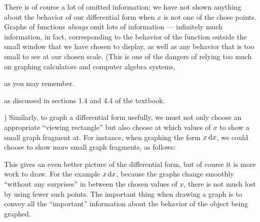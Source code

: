 There is of course a lot of omitted information; we have not shown anything about the behavior of our differential form when $x$ is not one of the chose points.
Graphs of functions \emph{always} omit lots of information --- infinitely much information, in fact, corresponding to the behavior of the function outside the small window that we have chosen to display, as well as any behavior that is too small to see at our chosen scale.
(This is one of the dangers of relying too much on graphing calculators and computer algebra systems,
\begin{notextbook}as you may remember.\end{notextbook}%
\begin{stewart}as discussed in sections 1.4 and 4.4 of the textbook.\end{stewart})
Similarly, to graph a differential form usefully, we must not only choose an appropriate ``viewing rectangle'' but also choose at which values of $x$ to show a small graph fragment at.
For instance, when graphing the form $x\,{\mathrm{d} x}$, we could choose to show more small graph fragments, as follows:
\begin{center}
\end{center}
This gives an even better picture of the differential form, but of course it is more work to draw.
For the example $x\,{\mathrm{d} x}$, because the graphs change smoothly ``without any surprises'' in between the chosen values of $x$, there is not much lost by using fewer such points.
The important thing when drawing a graph is to convey all the ``important'' information about the behavior of the object being graphed.

